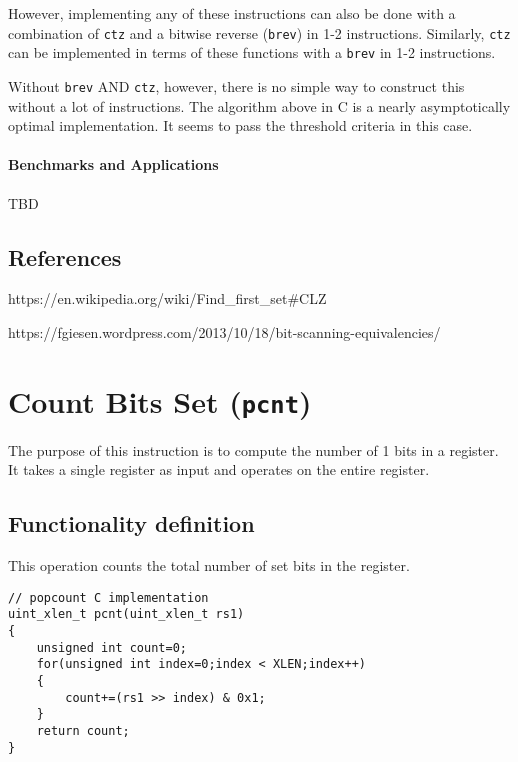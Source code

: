 However, implementing any of these instructions can also be done with a
combination of \texttt{ctz} and a bitwise reverse (\texttt{brev}) in 1-2
instructions. Similarly, \texttt{ctz} can be implemented in terms of
these functions with a \texttt{brev} in 1-2 instructions.

Without \texttt{brev} AND \texttt{ctz}, however, there is no simple way
to construct this without a lot of instructions. The algorithm above in
C is a nearly asymptotically optimal implementation. It seems to pass
the threshold criteria in this case.

\paragraph{Benchmarks and Applications}

TBD

\subsection{References}

https://en.wikipedia.org/wiki/Find\_first\_set\#CLZ

https://fgiesen.wordpress.com/2013/10/18/bit-scanning-equivalencies/


\section{Count Bits Set (\texttt{pcnt})}

The purpose of this instruction is to compute the number of 1 bits in a
register. It takes a single register as input and operates on the entire
register.

\subsection{Functionality definition}

This operation counts the total number of set bits in the register.

\begin{verbatim}
// popcount C implementation
uint_xlen_t pcnt(uint_xlen_t rs1)
{
    unsigned int count=0;
    for(unsigned int index=0;index < XLEN;index++)
    {
        count+=(rs1 >> index) & 0x1;
    }
    return count;
}
\end{verbatim}

